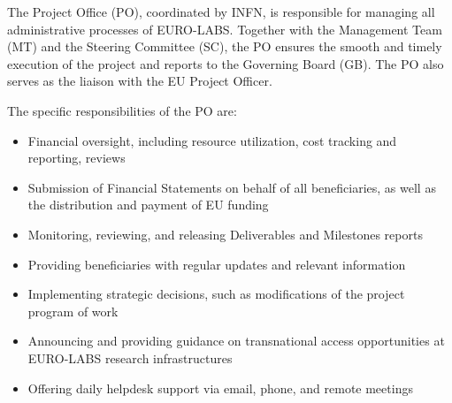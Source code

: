 
The Project Office (PO), coordinated by INFN, is responsible for managing all administrative processes of EURO-LABS. Together with the Management Team (MT) and the Steering Committee (SC), the PO ensures the smooth and timely execution of the project and reports to the Governing Board (GB). The PO also serves as the liaison with the EU Project Officer.

The specific responsibilities of the PO are:

\begin{itemize}
    \item Financial oversight, including resource utilization, cost tracking and reporting, reviews
    \item Submission of Financial Statements on behalf of all beneficiaries, as well as the distribution and payment of EU funding
    \item Monitoring, reviewing, and releasing Deliverables and Milestones reports
    \item Providing beneficiaries with regular updates and relevant information
    \item Implementing strategic decisions, such as modifications of the project program of work %
    \item Announcing and providing guidance on transnational access opportunities at EURO-LABS research infrastructures
    \item Offering daily helpdesk support via email, phone, and remote meetings
\end{itemize}

